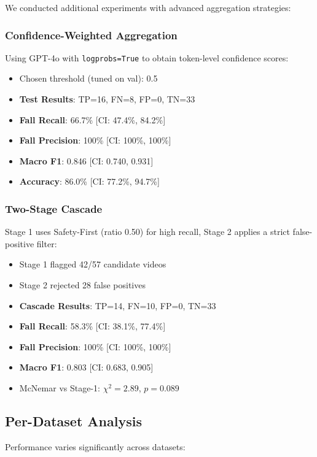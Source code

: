 \documentclass[conference]{IEEEtran}
\begin{document}
We conducted additional experiments with advanced aggregation strategies:

\subsubsection{Confidence-Weighted Aggregation}
Using GPT-4o with \texttt{logprobs=True} to obtain token-level confidence scores:
\begin{itemize}[leftmargin=*]
    \item Chosen threshold (tuned on val): 0.5
    \item \textbf{Test Results}: TP=16, FN=8, FP=0, TN=33
    \item \textbf{Fall Recall}: 66.7\% [CI: 47.4\%, 84.2\%]
    \item \textbf{Fall Precision}: 100\% [CI: 100\%, 100\%]
    \item \textbf{Macro F1}: 0.846 [CI: 0.740, 0.931]
    \item \textbf{Accuracy}: 86.0\% [CI: 77.2\%, 94.7\%]
\end{itemize}

\subsubsection{Two-Stage Cascade}
Stage 1 uses Safety-First (ratio 0.50) for high recall, Stage 2 applies a strict false-positive filter:
\begin{itemize}[leftmargin=*]
    \item Stage 1 flagged 42/57 candidate videos
    \item Stage 2 rejected 28 false positives
    \item \textbf{Cascade Results}: TP=14, FN=10, FP=0, TN=33
    \item \textbf{Fall Recall}: 58.3\% [CI: 38.1\%, 77.4\%]
    \item \textbf{Fall Precision}: 100\% [CI: 100\%, 100\%]
    \item \textbf{Macro F1}: 0.803 [CI: 0.683, 0.905]
    \item McNemar vs Stage-1: $\chi^2=2.89$, $p=0.089$
\end{itemize}

\subsection{Per-Dataset Analysis}

Performance varies significantly across datasets:
\end{document}
